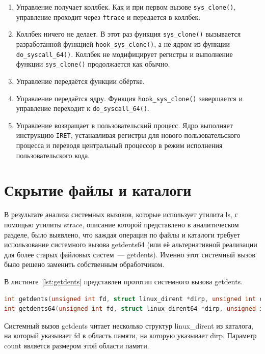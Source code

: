 \begin{enumerate}
	\item Управление получает коллбек. Как и при первом вызове \texttt{sys\_clone()}, управление проходит через \texttt{ftrace} и передается в коллбек.
	
	\item Коллбек ничего не делает. В этот раз функция \texttt{sys\_clone()} вызывается разработанной функцией \texttt{hook\_sys\_clone()}, а не ядром из функции \texttt{do\_syscall\_64()}. Коллбек не модифицирует регистры и выполнение функции \texttt{sys\_clone()} продолжается как обычно.
	
	\item Управление передаётся функции обёртке.
	
	\item Управление передаётся ядру. Функция \texttt{hook\_sys\_clone()} завершается и управление переходит к \texttt{do\_syscall\_64()}.
	
	\item Управление возвращает в пользовательский процесс. Ядро выполняет инструкцию \texttt{IRET}, устанавливая регистры для нового пользовательского процесса и переводя центральный процессор в режим исполнения пользовательского кода.
\end{enumerate}

\section{Скрытие файлы и каталоги}%
\label{sec:skrytie_protsessov}

В результате анализа системных вызовов, которые использует утилита ls, с помощью утилиты strace, описание которой представлено в аналитическом разделе, было выявлено, что каждая операция по файлы и каталоги требует использование системного вызова getdents64 (или её альтернативной реализации для более старых файловых систем~--- getdents). Именно этот системный вызов было решено заменить собственным обработчиком.

В листинге~\ref{lst:getdents} представлен прототип системного вызова getdents.
\begin{lstlisting}[language=c,caption={Прототип системного вызова getdents},label=lst:getdents]
int getdents(unsigned int fd, struct linux_dirent *dirp, unsigned int count);
int getdents64(unsigned int fd, struct linux_dirent64 *dirp, unsigned int count);
\end{lstlisting}

Системный вызов getdents читает несколько структур linux\_dirent из каталога, на который указывает fd в область памяти, на которую указывает dirp. Параметр count является размером этой области памяти.

